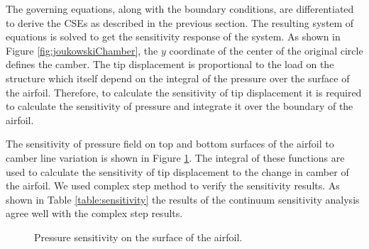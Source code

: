 \documentclass{aiaa-pretty}
\begin{document}
The governing equations, along with the boundary conditions, are differentiated to derive the CSEs as described in the previous section. The resulting system of equations is solved to get the sensitivity response of the system. As shown in Figure \ref{fig:joukowskiChamber}, the $y$ coordinate of the center of the original circle defines the camber. The tip displacement is proportional to the load on the structure which itself depend on the integral of the pressure over the surface of the airfoil. Therefore, to calculate the sensitivity of tip displacement it is required to calculate the sensitivity of pressure and integrate it over the boundary of the airfoil.

The sensitivity of pressure field on top and bottom surfaces of the airfoil to camber line variation is shown in Figure \ref{fig:joukowskiChamberSensitivity}. The integral of these functions are used to calculate the sensitivity of tip displacement to the change in camber of the airfoil. We used complex step method to verify the sensitivity results. As shown in Table \ref{table:sensitivity} the results of the continuum sensitivity analysis agree well with the complex step results.

%
	\begin{figure}[H]
		\centering
		\quad
		\caption{Pressure sensitivity on the surface of the airfoil.}
		\label{fig:joukowskiChamberSensitivity}
	\end{figure}
%
\end{document}
